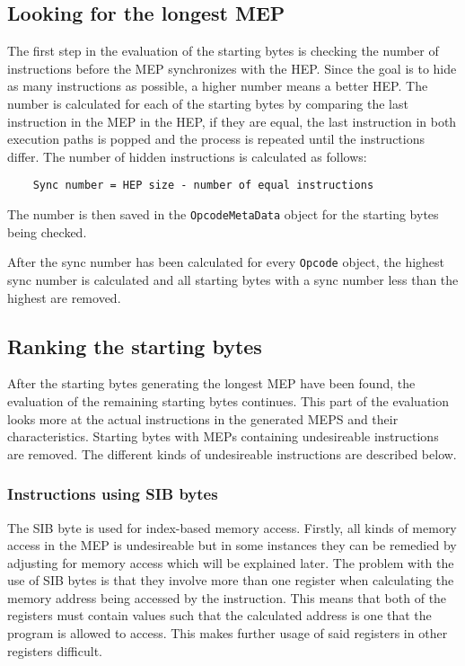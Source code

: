 \documentclass[11pt,twoside]{eitExjobb}
\begin{document}
\subsection{Looking for the longest MEP}
The first step in the evaluation of the starting bytes is checking the number of instructions before the MEP synchronizes with the HEP. Since the goal is to hide as many instructions as possible, a higher number means a better HEP. The number is calculated for each of the starting bytes by comparing the last instruction in the MEP in the HEP, if they are equal, the last instruction in both execution paths is popped and the process is repeated until the instructions differ. The number of hidden instructions is calculated as follows:

\begin{verbatim}
    Sync number = HEP size - number of equal instructions
\end{verbatim}

The number is then saved in the \texttt{OpcodeMetaData} object for the starting bytes being checked.

After the sync number has been calculated for every \texttt{Opcode} object, the highest sync number is calculated and all starting bytes with a sync number less than the highest are removed.


\subsection{Ranking the starting bytes}
After the starting bytes generating the longest MEP have been found, the evaluation of the remaining starting bytes continues. This part of the evaluation looks more at the actual instructions in the generated MEPS and their characteristics. Starting bytes with MEPs containing undesireable instructions are removed. The different kinds of undesireable instructions are described below.

\subsubsection{Instructions using SIB bytes}
The SIB byte is used for index-based memory access. Firstly, all kinds of memory access in the MEP is undesireable but in some instances they can be remedied by adjusting for memory access which will be explained later. The problem with the use of SIB bytes is that they involve more than one register when calculating the memory address being accessed by the instruction. This means that both of the registers must contain values such that the calculated address is one that the program is allowed to access. This makes further usage of said registers in other registers difficult.
\end{document}
